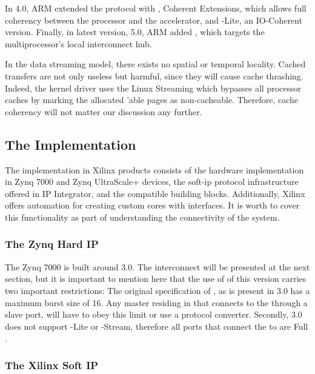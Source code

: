 In  4.0, ARM extended the  protocol with ,
 Coherent Extensions, which allows full coherency between
the processor and the accelerator, and -Lite, an IO-Coherent version. 
Finally, in latest  version, 5.0, ARM added , which targets the multiprocessor's
local interconnect hub.

In the data streaming model, there exists no spatial or temporal locality. 
Cached transfers are not only useless but harmful, since they will cause cache thrashing. 
Indeed, the kernel driver uses the Linux  Streaming  which bypasses all processor caches 
by marking the allocated 'able pages as non-cacheable.
Therefore, cache coherency will not matter our discussion any further.

\subsection{The  Implementation}

The  implementation in Xilinx products consists of the hardware 
implementation in Zynq 7000 and Zynq UltraScale+ devices,
the \gls{soft-ip} protocol infrastructure offered in IP Integrator, 
and the  compatible  building blocks. 
Additionally, Xilinx offers automation for creating 
custom cores with  interfaces.
It is worth to cover this functionality as 
part of understanding the connectivity of the system.

\subsubsection{The Zynq Hard IP}

The Zynq 7000 is built around  3.0. 
The interconnect will be presented at the next section,
but it is important to mention here that the use of  of this  version
carries two important restrictions: The original specification of ,
as is present in  3.0 has a maximum burst size of 16. Any  master
residing in  that connects to the  through a slave port,
will have to obey this limit or use a protocol converter. Secondly,  3.0 does not
support -Lite or -Stream, therefore all ports that connect the  to  are Full .

\subsubsection{The Xilinx Soft IP}

